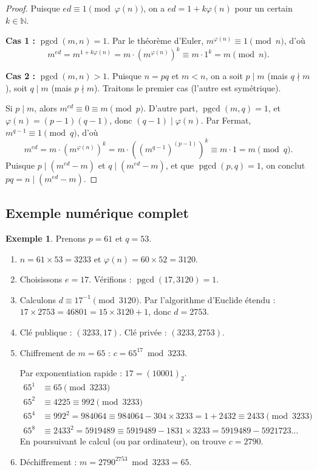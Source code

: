 \documentclass[12pt,a4paper,openany]{book}
\theoremstyle{definition}
\newtheorem{exemple}[definition]{Exemple}
\theoremstyle{plain}
\theoremstyle{remark}
\newcommand{\N}{\mathbb{N}}
\DeclareMathOperator{\pgcd}{pgcd}
\begin{document}
\begin{proof}
Puisque $ed \equiv 1 \pmod{\varphi(n)}$, on a $ed = 1 + k\varphi(n)$ pour un
certain $k \in \N$.

\textbf{Cas 1 :} $\pgcd(m, n) = 1$. Par le théorème d'Euler,
$m^{\varphi(n)} \equiv 1 \pmod{n}$, d'où
\[
  m^{ed} = m^{1 + k\varphi(n)} = m \cdot (m^{\varphi(n)})^k \equiv m \cdot 1^k
  = m \pmod{n}.
\]

\textbf{Cas 2 :} $\pgcd(m, n) > 1$. Puisque $n = pq$ et $m < n$, on a soit
$p \mid m$ (mais $q \nmid m$), soit $q \mid m$ (mais $p \nmid m$). Traitons le
premier cas (l'autre est symétrique).

Si $p \mid m$, alors $m^{ed} \equiv 0 \equiv m \pmod{p}$.
D'autre part, $\pgcd(m, q) = 1$, et $\varphi(n) = (p-1)(q-1)$, donc
$(q-1) \mid \varphi(n)$. Par Fermat, $m^{q-1} \equiv 1 \pmod{q}$, d'où
\[
  m^{ed} = m \cdot (m^{\varphi(n)})^k = m \cdot ((m^{q-1})^{(p-1)})^k
  \equiv m \cdot 1 = m \pmod{q}.
\]
Puisque $p \mid (m^{ed} - m)$ et $q \mid (m^{ed} - m)$, et que $\pgcd(p, q) = 1$,
on conclut $pq = n \mid (m^{ed} - m)$.
\end{proof}

\subsection{Exemple numérique complet}
\label{subsec:RSA-exemple}

\begin{exemple}
\label{ex:RSA}
Prenons $p = 61$ et $q = 53$.
\begin{enumerate}
  \item $n = 61 \times 53 = 3233$ et $\varphi(n) = 60 \times 52 = 3120$.
  \item Choisissons $e = 17$. Vérifions : $\pgcd(17, 3120) = 1$. \checkmark
  \item Calculons $d \equiv 17^{-1} \pmod{3120}$.
    Par l'algorithme d'Euclide étendu : $17 \times 2753 = 46801 = 15 \times 3120 + 1$,
    donc $d = 2753$.
  \item Clé publique : $(3233, 17)$. Clé privée : $(3233, 2753)$.
  \item Chiffrement de $m = 65$ : $c = 65^{17} \bmod 3233$.

    Par exponentiation rapide : $17 = (10001)_2$.
    \begin{align*}
      65^1 &\equiv 65 \pmod{3233} \\
      65^2 &\equiv 4225 \equiv 992 \pmod{3233} \\
      65^4 &\equiv 992^2 = 984064 \equiv 984064 - 304 \times 3233 = 1 + 2432 \equiv 2433 \pmod{3233}\\
      65^8 &\equiv 2433^2 = 5919489 \equiv 5919489 - 1831 \times 3233 = 5919489 - 5921723\ldots
    \end{align*}
    En poursuivant le calcul (ou par ordinateur), on trouve $c = 2790$.
  \item Déchiffrement : $m = 2790^{2753} \bmod 3233 = 65$. \checkmark
\end{enumerate}
\end{exemple}
\end{document}
